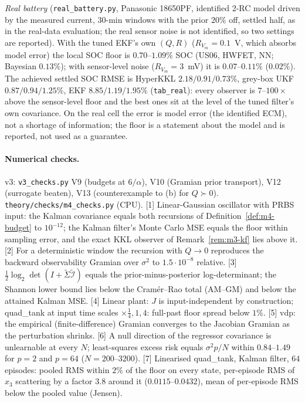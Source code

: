 \emph{Real battery} (\texttt{real\_battery.py}, Panasonic 18650PF, identified 2-RC model driven by the measured
current, 30-min windows with the prior $20\%$ off, settled half, as in the real-data evaluation; the real
sensor noise is not identified, so two settings are reported). With the tuned EKF's own $(Q,R)$ ($R_{V_m}=0.1$~V,
which absorbs model error) the local SOC floor is $0.70$--$1.09\%$ SOC (US06, HWFET, NN; Bayesian $0.13\%$);
with sensor-level noise ($R_{V_m}=3$~mV) it is $0.07$--$0.11\%$ ($0.02\%$). The achieved settled SOC RMSE is
HyperKKL $2.18/0.91/0.73\%$, grey-box UKF $0.87/0.94/1.25\%$, EKF $8.85/1.19/1.95\%$ (\texttt{tab\_real}): every
observer is $7$--$100\times$ above the sensor-level floor and the best ones sit at the level of the tuned filter's
own covariance. On the real cell the error is model error (the identified ECM), not a shortage of information;
the floor is a statement about the model and is reported, not used as a guarantee.

\paragraph{Numerical checks.} v3: \texttt{v3\_checks.py} V9 (budgets at $6/\alpha$), V10 (Gramian prior transport), V12
(surrogate beaten), V13 (counterexample to (b) for $Q\succ0$). \texttt{theory/checks/m4\_checks.py} (CPU). [1] Linear-Gaussian oscillator with PRBS
input: the Kalman covariance equals both recursions of Definition~\ref{def:m4-budget} to $10^{-12}$; the Kalman
filter's Monte Carlo MSE equals the floor within sampling error, and the exact KKL observer of
Remark~\ref{rem:m3-kf} lies above it. [2] For a deterministic window the recursion with $Q\to0$ reproduces the
backward observability Gramian over $\sigma^2$ to $1.5\cdot10^{-8}$ relative. [3] $\tfrac12\log_2\det(I+\tilde\Sigma\tilde{\mathcal I})$
equals the prior-minus-posterior log-determinant; the Shannon lower bound lies below the Cram\'er--Rao total
(AM--GM) and below the attained Kalman MSE. [4] Linear plant: $J$ is input-independent by construction;
quad\_tank at input time scales $\times\tfrac14,1,4$: full-past floor spread below $1\%$. [5] vdp: the empirical
(finite-difference) Gramian converges to the Jacobian Gramian as the perturbation shrinks. [6] A null direction
of the regressor covariance is unlearnable at every $N$; least-squares excess risk equals $\sigma^2p/N$ within
$0.84$--$1.49$ for $p=2$ and $p=64$ ($N=200$--$3200$). [7] Linearised quad\_tank, Kalman filter, $64$ episodes: pooled RMS within $2\%$
of the floor on every state, per-episode RMS of $x_3$ scattering by a factor $3.8$ around it ($0.0115$--$0.0432$), mean of per-episode RMS
below the pooled value (Jensen).

